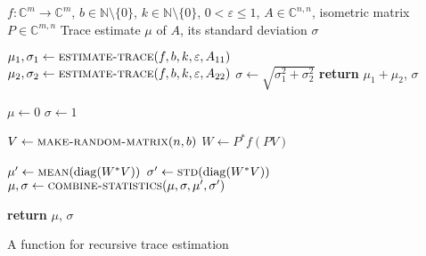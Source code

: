 \documentclass[%
	paper=a4,
	fontsize=10pt,
	DIV11,BCOR10mm,
	numbers=noenddot,
	abstract=yes
]{scrartcl}
\newcommand{\F}{\mathbb{C}}
\DeclareMathOperator{\diag}{diag}
\theoremstyle{definition}
\begin{document}
\begin{algorithm}
	\begin{algorithmic}
		\Require
			$f: \F^m \rightarrow \F^m$,
			$b \in \mathbb{N} \setminus \{0\}$,
			$k \in \mathbb{N} \setminus \{0\}$,
			$0 < \varepsilon \leq 1$,
			$A \in \F^{n,n}$,
			isometric matrix $P \in \F^{m,n}$
		\Ensure
			Trace estimate $\mu$ of $A$,
			its standard deviation $\sigma$

		\Statex
				\State $\mu_1, \sigma_1 \gets
					\textsc{estimate-trace}(f, b, k, \varepsilon, A_{11})$
				\State $\mu_2, \sigma_2 \gets
					\textsc{estimate-trace}(f, b, k, \varepsilon, A_{22})$
				\State $\sigma \gets \sqrt{\sigma_1^2+\sigma_2^2}$
				\State \textbf{return} $\mu_1+\mu_2$, $\sigma$
			\EndIf

			\Statex
			\State $\mu \gets 0$
			\State $\sigma \gets 1$

			\Statex
				\State $V \gets \textsc{make-random-matrix}(n, b)$
				\State $W \gets P^* f(P V)$

				\Statex
				\State $\mu' \gets \textsc{mean}(\diag(W^* V))$
				\State $\sigma' \gets \textsc{std}(\diag(W^* V))$
				\State $\mu, \sigma \gets
					\textsc{combine-statistics}(\mu, \sigma, \mu', \sigma')$
			\EndWhile

			\Statex
			\State \textbf{return} $\mu$, $\sigma$
		\EndFunction
	\end{algorithmic}
	\caption{A function for recursive trace estimation}
	\label{algo:estimate-trace}
\end{algorithm}

\printbibliography
\end{document}
